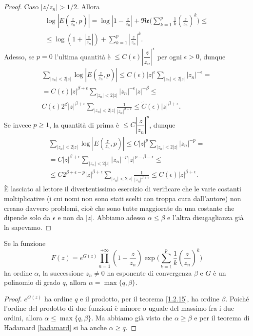 \begin{proof}
  Caso $|z/z_n|>1/2$. Allora
  \begin{gather*}
    \log\left|E\left(\frac{z}{z_n},p\right)\right|=\log\left|1-\frac{z}{z_n}\right|+\mathfrak{Re}\Bigg(\sum_{k=1}^p \frac{1}{k}\left(\frac{z}{z_n}\right)^k\Bigg) \le \\
    \le \log\left(1+\left|\frac{z}{z_n}\right|\right)+\sum_{k=1}^p \left|\frac{z}{z_n}\right|^k.
  \end{gather*}
  Adesso, se $p=0$ l'ultima quantità è $\le C(\epsilon)\left|\dfrac{z}{z_n}\right|^{\epsilon}$ per ogni $\epsilon>0$, dunque
  \begin{gather*}
    \sum_{|z_n|<2|z|}\log\left|E\left(\frac{z}{z_n},p\right)\right| \le C(\epsilon)|z|^{\epsilon}\sum_{|z_n|<2|z|}|z_n|^{-\epsilon}= \\
    =C(\epsilon)|z|^{\beta+\epsilon}\sum_{|z_n|<2|z|}|z_n|^{-\epsilon}|z|^{-\beta} \le \\
    C(\epsilon)2^{\beta}|z|^{\beta+\epsilon}\sum_{|z_n|<2|z|}\frac{1}{|z_n|^{\beta+\epsilon}} \le \tilde{C}(\epsilon)|z|^{\beta+\epsilon}.
  \end{gather*}
  Se invece $p \ge 1$, la quantità di prima è $\le C\left|\dfrac{z}{z_n}\right|^p$, dunque
  \begin{gather*}
    \sum_{|z_n|<2|z|}\log\left|E\left(\frac{z}{z_n},p\right)\right| \le C|z|^p \sum_{|z_n|<2|z|}|z_n|^{-p}= \\
    =C|z|^{\beta+\epsilon}\sum_{|z_n|<2|z|}|z_n|^{-p}|z|^{p-\beta-\epsilon} \le \\
    \le C2^{\beta+\epsilon-p}|z|^{\beta+\epsilon}\sum_{|z_n|<2|z|}\frac{1}{|z_n|^{\beta+\epsilon}} \le C(\epsilon)|z|^{\beta+\epsilon}.
  \end{gather*}
  È lasciato al lettore il divertentissimo esercizio di verificare che le varie costanti moltiplicative (i cui nomi non sono stati scelti con troppa cura dall'autore) non creano davvero problemi, cioè che sono tutte maggiorate da una costante che dipende solo da $\epsilon$ e non da $|z|$. Abbiamo adesso $\alpha \le \beta$ e l'altra disugaglianza già la sapevamo.
\end{proof}

\begin{cor}
  Se la funzione
  $$F(z)=e^{G(z)}\prod_{n=1}^{+\infty}\left(1-\frac{z}{z_n}\right)\exp\Bigg(\sum_{k=1}^p\frac{1}{k}\left(\frac{z}{z_n}\right)^k\Bigg)$$
  ha ordine $\alpha$, la successione $z_n\not=0$ ha esponente di convergenza $\beta$ e $G$ è un polinomio di grado $q$, allora $\alpha=\max\{q,\beta\}$.
\end{cor}

\begin{proof}
  $e^{G(z)}$ ha ordine $q$ e il prodotto, per il teorema \ref{1.2.15}, ha ordine $\beta$. Poiché l'ordine del prodotto di due funzioni è minore o uguale del massimo fra i due ordini, allora $\alpha \le \max\{q,\beta\}$. Ma abbiamo già visto che $\alpha \ge \beta$ e per il teorema di Hadamard \ref{hadamard} si ha anche $\alpha \ge q$.
\end{proof}
